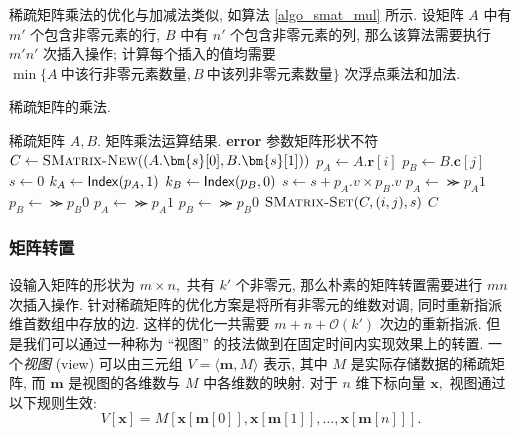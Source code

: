 稀疏矩阵乘法的优化与加减法类似, 如算法 \ref{algo_smat_mul} 所示. 设矩阵 $A$ 中有 $m'$ 个包含非零元素的行, $B$ 中有 $n'$ 个包含非零元素的列, 那么该算法需要执行 $m' n'$ 次插入操作; 计算每个插入的值均需要 $\min\{A\ \text{中该行非零元素数量}, B\ \text{中该列非零元素数量}\}$ 次浮点乘法和加法.
\begin{breakablealgorithm}
\caption{稀疏矩阵的乘法.}
\label{algo_smat_mul}
\begin{algorithmic}[1]
\Require 稀疏矩阵 $A, B.$
\Ensure 矩阵乘法运算结果.
        \State \textbf{error} 参数矩阵形状不符
    \EndIf
    \State $C \gets \textsc{SMatrix-New}((A.\bm{s}[0], B.\bm{s}[1]))$
            \State $p_A \gets A.\bm{r}[i]$
            \State $p_B \gets B.\bm{c}[j]$
            \State $s \gets 0$
                    \State $k_A \gets \mathsf{Index}(p_A, 1)$
                    \State $k_B \gets \mathsf{Index}(p_B, 0)$
                        \State $s \gets s + p_A.v \times p_B.v$
                    \EndIf
                    \If{}
                    \EndIf
                        \State $p_A \gets \Succ{p_A}{1}$
                    \EndIf
                        \State $p_B \gets \Succ{p_B}{0}$
                    \EndIf
                    \State $p_A \gets \Succ{p_A}{1}$
                \Else
                    \State $p_B \gets \Succ{p_B}{0}$
                \EndIf
            \EndWhile
            \State $\textsc{SMatrix-Set}(C, (i, j), s)$
        \EndFor
    \EndFor
    \State \Return $C$
\EndFunction
\end{algorithmic}
\end{breakablealgorithm}

\subsubsection{矩阵转置}

设输入矩阵的形状为 $m \times n,$ 共有 $k'$ 个非零元, 那么朴素的矩阵转置需要进行 $mn$ 次插入操作. 针对稀疏矩阵的优化方案是将所有非零元的维数对调, 同时重新指派维首数组中存放的边. 这样的优化一共需要 $m + n + \mathcal{O}(k')$ 次边的重新指派. 但是我们可以通过一种称为 “视图” 的技法做到在固定时间内实现效果上的转置. 一个\textit{视图} (view) 可以由三元组 $V = \langle \bm{m}, M \rangle$ 表示, 其中 $M$ 是实际存储数据的稀疏矩阵, 而 $\bm{m}$ 是视图的各维数与 $M$ 中各维数的映射. 对于 $n$ 维下标向量 $\bm{x},$ 视图通过以下规则生效:
\begin{equation}
    V[\bm{x}] = M[\bm{x}[\bm{m}[0]], \bm{x}[\bm{m}[1]], \hdots, \bm{x}[\bm{m}[n]]].
\end{equation}

